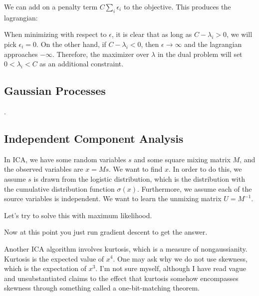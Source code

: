\documentclass[12pt]{article}
\begin{document}
We can add on a penalty term $C\sum_i \epsilon_i$ to the objective. This produces the lagrangian:


When minimizing with respect to $\epsilon$, it is clear that as long as $C-\lambda_i > 0$, we will pick $\epsilon_i = 0$. On the other hand, if $C -\lambda_i < 0$, then $\epsilon \rightarrow \infty$ and the lagrangian approaches $- \infty$. Therefore, the maximizer over $\lambda$ in the dual problem will set $0 < \lambda_i < C$ as an additional constraint.

\subsection{Gaussian Processes}
.
\subsection{Independent Component Analysis}

In ICA, we have some random variables $s$ and some square mixing matrix $M$, and the observed variables are $x = Ms$. We want to find $x$. In order to do this, we assume $s$ is drawn from the logistic distribution, which is the distribution with the cumulative distribution function $\sigma(x)$. Furthermore, we assume each of the source variables is independent. We want to learn the unmixing matrix $U = M^{-1}$. 

Let's try to solve this with maximum likelihood.


Now at this point you just run gradient descent to get the answer. 

Another ICA algorithm involves kurtosis, which is a measure of nongaussianity. Kurtosis is the expected value of $x^4$. One may ask why we do not use skewness, which is the expectation of $x^3$. I'm not sure myself, although I have read vague and unsubstantiated claims to the effect that kurtosis somehow encompasses skewness through something called a one-bit-matching theorem.
\end{document}
